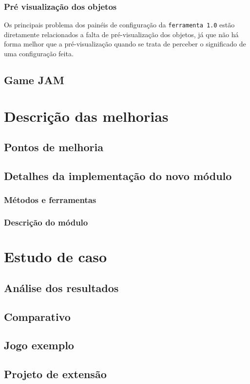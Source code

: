 \documentclass[12pt,twoside,openright,a4paper,english,brazil,sumario=tradicional]{abntex2}
\begin{document}
\subsection{Pré visualização dos objetos}

Os principais problema dos painéis de configuração da \texttt{ferramenta 1.0} estão diretamente relacionados a falta de pré-visualização dos objetos, já que não há forma melhor que a pré-visualização quando se trata de perceber o significado de uma configuração feita.


\section{Game JAM} %

\chapter{Descrição das melhorias} %
\label{chap:melhorias}
\section{Pontos de melhoria}
\section{Detalhes da implementação do novo módulo}
\subsection{Métodos e ferramentas}
\subsection{Descrição do módulo}

\chapter{Estudo de caso}
\label{chap:caso}
\section{Análise dos resultados}
\section{Comparativo}
\section{Jogo exemplo}
\section{Projeto de extensão}
\end{document}
